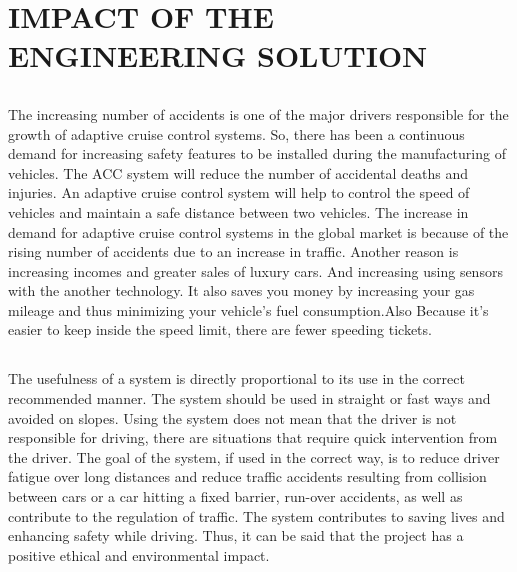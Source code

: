 \documentclass[12pt,a4paper]{report}
\begin{document}

\chapter{IMPACT OF THE ENGINEERING SOLUTION}
\section{\fontsize{12}{12}\selectfont{Economical, Societal and Global}}
The increasing number of accidents is one of the major drivers responsible for the growth of adaptive cruise control systems. So, there has been a continuous demand for increasing safety features to be installed during the manufacturing of vehicles. The ACC system will reduce the number of accidental deaths and injuries. An adaptive cruise control system will help to control the speed of vehicles and maintain a safe distance between two vehicles. 
The increase in demand for adaptive cruise control systems in the global market is because of the rising number of accidents due to an increase in traffic. Another reason is increasing incomes and greater sales of luxury cars. And increasing using sensors with the another technology.
It also saves you money by increasing your gas mileage and thus minimizing your vehicle's fuel consumption.Also Because it's easier to keep inside the speed limit, there are fewer speeding tickets.


\section{\fontsize{12}{12}\selectfont{Environmental and Ethical}}
The usefulness of a system is directly proportional to its use in the correct recommended manner. The system should be used in straight or fast ways and avoided on slopes. Using the system does not mean that the driver is not responsible for driving, there are situations that require quick intervention from the driver.
The goal of the system, if used in the correct way, is to reduce driver fatigue over long distances and reduce traffic accidents resulting from collision between cars or a car hitting a fixed barrier, run-over accidents, as well as contribute to the regulation of traffic.
The system contributes to saving lives and enhancing safety while driving. Thus, it can be said that the project has a positive ethical and environmental impact.
\end{document}
